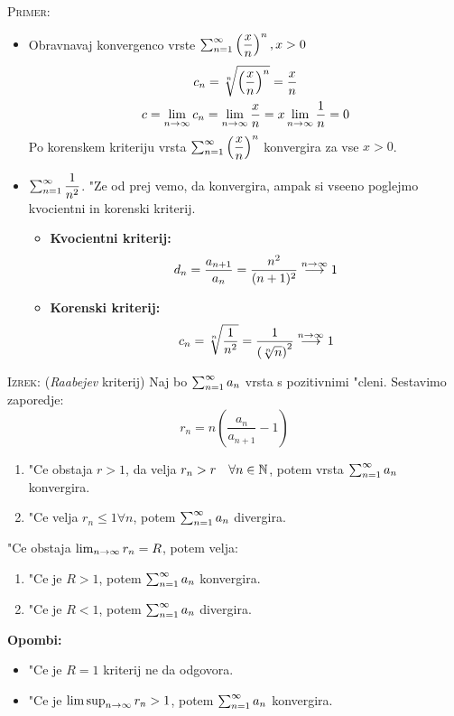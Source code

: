 \textsc{Primer:}
\begin{itemize}
	\item Obravnavaj konvergenco vrste $\sum_{n = 1}^{\infty}\left(\dfrac{x}{n}\right)^n, x > 0$
	\begin{gather*}
		c_n = \sqrt[n]{\left(\dfrac{x}{n}\right)^n} = \dfrac{x}{n} \\
		c = \lim_{n \rightarrow \infty} c_n = \lim_{n \rightarrow \infty} \dfrac{x}{n} = x \lim_{n \rightarrow \infty} \dfrac{1}{n} = 0
	\end{gather*}
	Po korenskem kriteriju vrsta $\sum_{n = 1}^{\infty}\left(\dfrac{x}{n}\right)^n$ konvergira za vse $x > 0$.
	
	\item $\sum_{n = 1}^{\infty}\dfrac{1}{n^2}$. "Ze od prej vemo, da konvergira, ampak si vseeno poglejmo kvocientni in korenski kriterij.
	\begin{itemize}
		\item \textbf{Kvocientni kriterij:}
		\begin{equation*}
		d_n = \dfrac{a_{n+1}}{a_n} = \dfrac{n^2}{(n+1)^2} \stackrel{n \rightarrow \infty}{\longrightarrow} 1
		\end{equation*}
		\item \textbf{Korenski kriterij:}
		\begin{equation*}
		c_n = \sqrt[n]{\dfrac{1}{n^2}} = \dfrac{1}{\left(\sqrt[n]{n}\right)^2} \stackrel{n \rightarrow \infty}{\longrightarrow} 1
		\end{equation*}
	\end{itemize}
\end{itemize}
%
\textsc{Izrek:} (\emph{Raabejev} kriterij) Naj bo $\sum_{n = 1}^{\infty}a_n$ vrsta s pozitivnimi "cleni. Sestavimo zaporedje:
\begin{equation*}
r_n = n\left(\dfrac{a_n}{a_{n+1}} - 1\right)
\end{equation*}
\begin{enumerate}[1)]
	\item "Ce obstaja $r > 1$, da velja $r_n > r \quad \forall n \in \mathbb{N}$, potem vrsta $\sum_{n = 1}^{\infty}a_n$ konvergira.
	\item "Ce velja $r_n \leq 1 \forall n$, potem $\sum_{n = 1}^{\infty}a_n$ divergira.
\end{enumerate}
"Ce obstaja $\lim_{n \rightarrow \infty} r_n = R$, potem velja:
\begin{enumerate}[1')]
	\item "Ce je $R > 1$, potem $\sum_{n = 1}^{\infty}a_n$ konvergira.
	\item "Ce je $R < 1$, potem $\sum_{n = 1}^{\infty}a_n$ divergira.
\end{enumerate}
\textbf{Opombi:}
\begin{itemize}
	\item "Ce je $R=1$ kriterij ne da odgovora.
	\item "Ce je $\limsup_{n \rightarrow \infty} r_n > 1$, potem $\sum_{n = 1}^{\infty}a_n$ konvergira.
\end{itemize}
